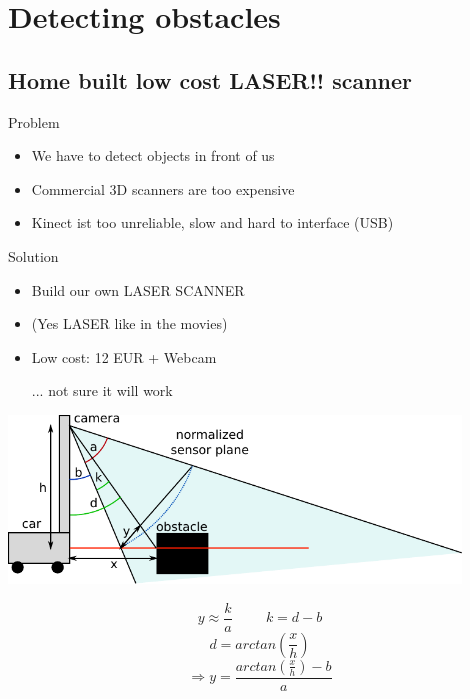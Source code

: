 \documentclass[pdf]{beamer}
\begin{document}
\section{Detecting obstacles}
\subsection{Home built low cost LASER!! scanner}
\begin{frame}
\begin{alertblock}{Problem}
\begin{itemize}
  \item We have to detect objects in front of us
  \item Commercial 3D scanners are too expensive
  \item Kinect ist too unreliable, slow and hard to interface (USB)
\end{itemize}
\end{alertblock}
\begin{exampleblock}{Solution}
\begin{itemize}
  \item Build our own LASER SCANNER
  \item (Yes LASER like in the movies)
  \item Low cost: 12 EUR + Webcam
  \item[...] not sure it will work
\end{itemize}
\end{exampleblock}
\end{frame}
\begin{frame}
  \begin{center}
  \includegraphics[width = 0.9\textwidth]{pics/laser.pdf}
  \end{center}
$$y\approx \frac{k}{a} \hspace{1cm} k = d - b$$
$$d = arctan\left( \frac{x}{h} \right)$$
$$\Rightarrow y = \frac{arctan \left( \frac{x}{h} \right) - b }{a}$$
\end{frame}
\end{document}
